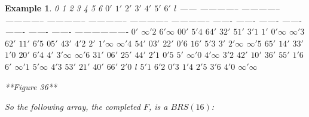 \documentclass[
  11pt,
  a4paper]{book}
\newtheorem{example}{Example}
\begin{document}
\begin{example}
               0              1              2              3              4              5              6         $0'$    $1'$    $2'$    $3'$    $4'$    $5'$    $6'$           $l$
  ------ -------------- -------------- -------------- -------------- -------------- -------------- -------------- ------- ------- ------- ------- ------- ------- ------- -------------------
   $0'$                                 $\infty ' 2$                                                $6' \infty$    $00'$           $5'4$   $64'$           $32'$   $51'$         $3'1$
   $1'$   $0' \infty$                                  $\infty ' 3$                                                $62'$   $11'$           $6'5$   $05'$           $43'$         $4'2$
   $2'$                  $1' \infty$                                  $\infty ' 4$                                 $54'$   $03'$   $22'$           $0'6$   $16'$                 $5'3$
   $3'$                                 $2' \infty$                                  $\infty ' 5$                          $65'$   $14'$   $33'$           $1'0$   $20'$         $6'4$
   $4'$                                                $3' \infty$                                  $\infty ' 6$   $31'$           $06'$   $25'$   $44'$           $2'1$         $0'5$
   $5'$   $\infty ' 0$                                                $4' \infty$                                  $3'2$   $42'$           $10'$   $36'$   $55'$                 $1'6$
   $6'$                  $\infty ' 1$                                                $5' \infty$                           $4'3$   $53'$           $21'$   $40'$   $66'$         $2'0$
   $l$                                                                                                             $5'1$   $6'2$   $0'3$   $1'4$   $2'5$   $3'6$   $4'0$   $\infty ' \infty$

**Figure 36**

So the following array, the completed $F$, is a $BRS(16)$:


\end{example}
\end{document}
